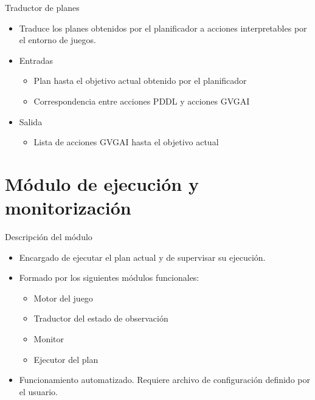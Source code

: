 \documentclass[11pt]{beamer}    %
\begin{document}
    \begin{frame}{Traductor de planes}
        \begin{itemize}
            \item Traduce los planes obtenidos por el planificador a acciones interpretables
            por el entorno de juegos.
            \item \alert{Entradas}
            \begin{itemize}
                \item Plan hasta el objetivo actual obtenido por el planificador
                \item Correspondencia entre acciones PDDL y acciones GVGAI
            \end{itemize}
            \item \alert{Salida}
            \begin{itemize}
                \item Lista de acciones GVGAI hasta el objetivo actual
            \end{itemize}
        \end{itemize}
    \end{frame}

    \section{Módulo de ejecución y monitorización}

    \begin{frame}{Descripción del módulo}
        \begin{itemize}
            \item Encargado de \alert{ejecutar} el plan actual y de \alert{supervisar} su ejecución.
            \item Formado por los siguientes módulos funcionales:

            \begin{itemize}
                \item Motor del juego
                \item Traductor del estado de observación
                \item Monitor
                \item Ejecutor del plan
            \end{itemize}
            \item Funcionamiento automatizado. Requiere archivo de configuración definido
            por el usuario.
        \end{itemize}
    \end{frame}
\end{document}
